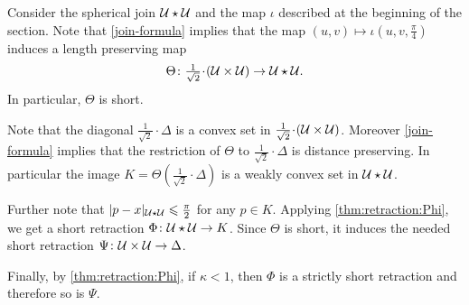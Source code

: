 \documentclass[oneside,a4paper, 12pt]{article}
\begin{document}
Consider the spherical join $\mathcal{U}\star\mathcal{U}$ and the map $\iota$ described at the beginning of the section. 
Note that \ref{join-formula} implies that the map $(u,v)\mapsto \iota(u,v,\tfrac\pi4)$
induces a length preserving map 
\[\Theta\:{\tfrac1{\sqrt{2}}}\cdot(\spc{U}\times\spc{U})\to\spc{U}\star\spc{U}.\]
In particular, $\Theta$ is short.

Note that the diagonal $\tfrac1{\sqrt{2}}\cdot\Delta$ is a convex set in $\tfrac1{\sqrt{2}}\cdot(\spc{U}\times\spc{U})$.
Moreover \ref{join-formula} implies that the restriction of $\Theta$ to $\tfrac1{\sqrt{2}}\cdot\Delta$ is distance preserving.
In particular the image $K=\Theta(\tfrac1{\sqrt{2}}\cdot\Delta)$ is a weakly convex set in $\mathcal{U}\star\mathcal{U}$.

Further note that $|p-x|_{\mathcal{U}\star\mathcal{U}}\leqslant \tfrac\pi2$ for any $p\in K$.
Applying \ref{thm:retraction:Phi}, we get a short retraction $\Phi\colon\mathcal{U}\star\mathcal{U}\to K$.
Since $\Theta$ is short, it induces the needed short retraction $\Psi\colon\mathcal{U}\times\mathcal{U}\to \Delta$.

Finally, by \ref{thm:retraction:Phi}, if $\kappa<1$, then $\Phi$ is a strictly short retraction and therefore so is $\Psi$.
\qeds



{\small\sloppy

\printbibliography[heading=bibintoc]

}
\end{document}
